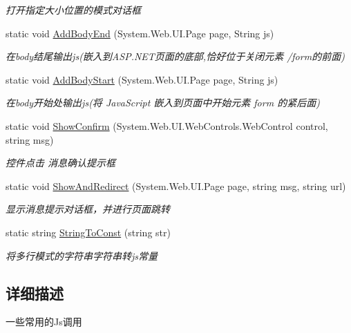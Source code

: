 \begin{DoxyCompactItemize}
\begin{DoxyCompactList}\small\item\em 打开指定大小位置的模式对话框 \end{DoxyCompactList}\item 
static void \hyperlink{class_x_c_l_net_tools_1_1_javascript_1_1_jscript_a3dcdf2894a7187508492083b6743abe1}{Add\+Body\+End} (System.\+Web.\+U\+I.\+Page page, String js)
\begin{DoxyCompactList}\small\item\em 在body结尾输出js(嵌入到\+A\+S\+P.\+N\+E\+T页面的底部,恰好位于关闭元素 /form的前面) \end{DoxyCompactList}\item 
static void \hyperlink{class_x_c_l_net_tools_1_1_javascript_1_1_jscript_ab8e14181b9b1e9f12462ef20f49d69ee}{Add\+Body\+Start} (System.\+Web.\+U\+I.\+Page page, String js)
\begin{DoxyCompactList}\small\item\em 在body开始处输出js(将 Java\+Script 嵌入到页面中开始元素 form 的紧后面) \end{DoxyCompactList}\item 
static void \hyperlink{class_x_c_l_net_tools_1_1_javascript_1_1_jscript_a94e45aa47def3164202b40ff0405f922}{Show\+Confirm} (System.\+Web.\+U\+I.\+Web\+Controls.\+Web\+Control control, string msg)
\begin{DoxyCompactList}\small\item\em 控件点击 消息确认提示框 \end{DoxyCompactList}\item 
static void \hyperlink{class_x_c_l_net_tools_1_1_javascript_1_1_jscript_ade747fd49c7e14dae3652e014a6255d9}{Show\+And\+Redirect} (System.\+Web.\+U\+I.\+Page page, string msg, string url)
\begin{DoxyCompactList}\small\item\em 显示消息提示对话框，并进行页面跳转 \end{DoxyCompactList}\item 
static string \hyperlink{class_x_c_l_net_tools_1_1_javascript_1_1_jscript_a169e7cb3d0960d4757f4b0f831fa0551}{String\+To\+Const} (string str)
\begin{DoxyCompactList}\small\item\em 将多行模式的字符串字符串转js常量 \end{DoxyCompactList}\end{DoxyCompactItemize}


\subsection{详细描述}
一些常用的\+Js调用 



